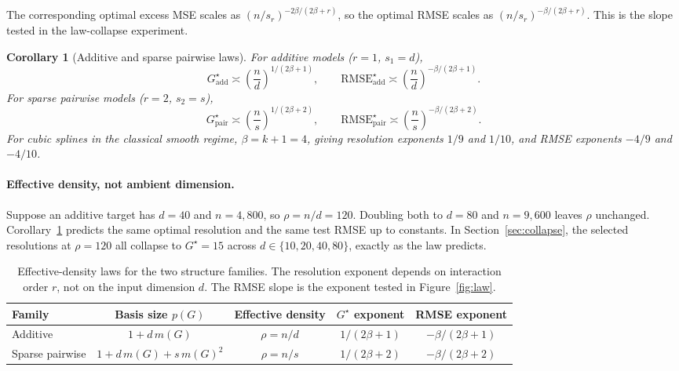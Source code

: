 \documentclass{article}
\newcommand{\add}{\mathrm{add}}
\newcommand{\pair}{\mathrm{pair}}
\newtheorem{corollary}{Corollary}
\begin{document}
The corresponding optimal excess MSE scales as $(n/s_r)^{-2\beta/(2\beta+r)}$, so the optimal RMSE scales as $(n/s_r)^{-\beta/(2\beta+r)}$. This is the slope tested in the law-collapse experiment.

\begin{corollary}[Additive and sparse pairwise laws]
\label{cor:effective_density}
For additive models ($r=1$, $s_1=d$),
\begin{equation}
    G_{\add}^\star \asymp \left(\frac{n}{d}\right)^{1/(2\beta+1)},
    \qquad
    \mathrm{RMSE}_{\add}^\star \asymp \left(\frac{n}{d}\right)^{-\beta/(2\beta+1)}.
    \label{eq:additive_law}
\end{equation}
For sparse pairwise models ($r=2$, $s_2=s$),
\begin{equation}
    G_{\pair}^\star \asymp \left(\frac{n}{s}\right)^{1/(2\beta+2)},
    \qquad
    \mathrm{RMSE}_{\pair}^\star \asymp \left(\frac{n}{s}\right)^{-\beta/(2\beta+2)}.
    \label{eq:pairwise_law}
\end{equation}
For cubic splines in the classical smooth regime, $\beta=k+1=4$, giving resolution exponents $1/9$ and $1/10$, and RMSE exponents $-4/9$ and $-4/10$.
\end{corollary}

\paragraph{Effective density, not ambient dimension.}
Suppose an additive target has $d=40$ and $n=4{,}800$, so $\rho=n/d=120$. Doubling both to $d=80$ and $n=9{,}600$ leaves $\rho$ unchanged. Corollary~\ref{cor:effective_density} predicts the same optimal resolution and the same test RMSE up to constants. In Section~\ref{sec:collapse}, the selected resolutions at $\rho=120$ all collapse to $G^\star = 15$ across $d\in\{10,20,40,80\}$, exactly as the law predicts.

\begin{table}[t]
\caption{Effective-density laws for the two structure families. The resolution exponent depends on interaction order $r$, not on the input dimension $d$. The RMSE slope is the exponent tested in Figure~\ref{fig:law}.}
\label{tab:laws}
\centering
\small
\begin{tabular}{@{}lcccc@{}}
\toprule
Family & Basis size $p(G)$ & Effective density & $G^\star$ exponent & RMSE exponent \\
\midrule
Additive & $1+d\,m(G)$ & $\rho=n/d$ & $1/(2\beta+1)$ & $-\beta/(2\beta+1)$ \\
Sparse pairwise & $1+d\,m(G)+s\,m(G)^2$ & $\rho=n/s$ & $1/(2\beta+2)$ & $-\beta/(2\beta+2)$ \\
\bottomrule
\end{tabular}
\end{table}
\end{document}
